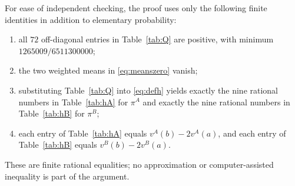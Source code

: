\documentclass[11pt]{article}
\begin{document}
For ease of independent checking, the proof uses only the following finite
identities in addition to elementary probability:
\begin{enumerate}
\item all $72$ off-diagonal entries in Table~\ref{tab:Q} are positive, with
minimum $1265009/6511300000$;
\item the two weighted means in \eqref{eq:meanszero} vanish;
\item substituting Table~\ref{tab:Q} into \eqref{eq:defh} yields exactly the
nine rational numbers in Table~\ref{tab:hA} for $\pi^A$ and exactly the nine
rational numbers in Table~\ref{tab:hB} for $\pi^B$;
\item each entry of Table~\ref{tab:hA} equals $v^A(b)-2v^A(a)$, and each entry
of Table~\ref{tab:hB} equals $v^B(b)-2v^B(a)$.
\end{enumerate}
These are finite rational equalities; no approximation or computer-assisted
inequality is part of the argument.
\end{document}
